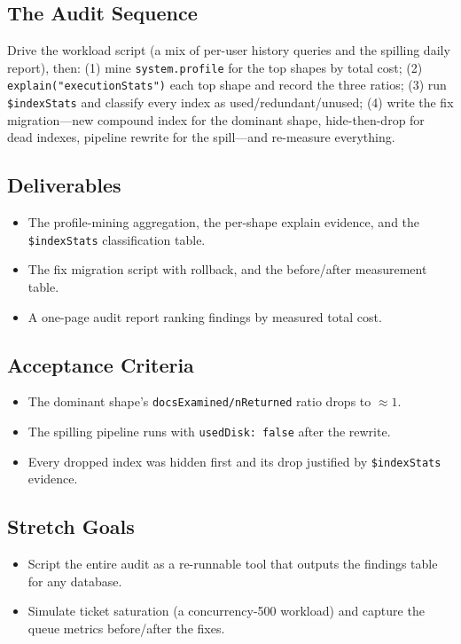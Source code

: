 \subsection{The Audit Sequence}
Drive the workload script (a mix of per-user history queries and the spilling daily report), then: (1) mine \texttt{system.profile} for the top shapes by total cost; (2) \texttt{explain("executionStats")} each top shape and record the three ratios; (3) run \texttt{\$indexStats} and classify every index as used/redundant/unused; (4) write the fix migration---new compound index for the dominant shape, hide-then-drop for dead indexes, pipeline rewrite for the spill---and re-measure everything.

\subsection*{Deliverables}
\begin{itemize}
    \item The profile-mining aggregation, the per-shape explain evidence, and the \texttt{\$indexStats} classification table.
    \item The fix migration script with rollback, and the before/after measurement table.
    \item A one-page audit report ranking findings by measured total cost.
\end{itemize}

\subsection*{Acceptance Criteria}
\begin{itemize}
    \item The dominant shape's \texttt{docsExamined/nReturned} ratio drops to ${\approx}1$.
    \item The spilling pipeline runs with \texttt{usedDisk: false} after the rewrite.
    \item Every dropped index was hidden first and its drop justified by \texttt{\$indexStats} evidence.
\end{itemize}

\subsection*{Stretch Goals}
\begin{itemize}
    \item Script the entire audit as a re-runnable tool that outputs the findings table for any database.
    \item Simulate ticket saturation (a concurrency-500 workload) and capture the queue metrics before/after the fixes.
\end{itemize}

